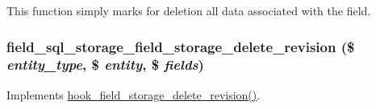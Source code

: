 This function simply marks for deletion all data associated with the field. \hypertarget{field__sql__storage_8module_a40aaf2be81e9ed697296e13b3bbb2644}{
\subsubsection[{field\_\-sql\_\-storage\_\-field\_\-storage\_\-delete\_\-revision}]{\setlength{\rightskip}{0pt plus 5cm}field\_\-sql\_\-storage\_\-field\_\-storage\_\-delete\_\-revision (\$ {\em entity\_\-type}, \/  \$ {\em entity}, \/  \$ {\em fields})}}
\label{field__sql__storage_8module_a40aaf2be81e9ed697296e13b3bbb2644}
Implements \hyperlink{group__field__storage_ga74ff0893fd8d05ab372bd4b65d0ffc71}{hook\_\-field\_\-storage\_\-delete\_\-revision()}.

